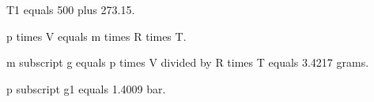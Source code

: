 T1 equals 500 plus 273.15.  

p times V equals m times R times T.  

m subscript g equals p times V divided by R times T equals 3.4217 grams.  

p subscript g1 equals 1.4009 bar.